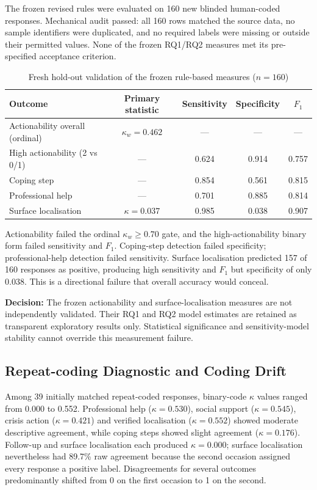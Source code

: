 The frozen revised rules were evaluated on 160 new blinded human-coded responses. Mechanical audit passed: all 160 rows matched the source data, no sample identifiers were duplicated, and no required labels were missing or outside their permitted values. None of the frozen RQ1/RQ2 measures met its pre-specified acceptance criterion.

\begin{table}[H]
\centering
\caption{Fresh hold-out validation of the frozen rule-based measures ($n=160$)}
\label{tab:fresh_holdout}
\begin{tabular}{lcccc}
\toprule
Outcome & Primary statistic & Sensitivity & Specificity & $F_1$ \\
\midrule
Actionability overall (ordinal) & $\kappa_w=0.462$ & --- & --- & --- \\
High actionability (2 vs 0/1) & --- & 0.624 & 0.914 & 0.757 \\
Coping step & --- & 0.854 & 0.561 & 0.815 \\
Professional help & --- & 0.701 & 0.885 & 0.814 \\
Surface localisation & $\kappa=0.037$ & 0.985 & 0.038 & 0.907 \\
\bottomrule
\end{tabular}
\end{table}

Actionability failed the ordinal $\kappa_w\geq0.70$ gate, and the high-actionability binary form failed sensitivity and $F_1$. Coping-step detection failed specificity; professional-help detection failed sensitivity. Surface localisation predicted 157 of 160 responses as positive, producing high sensitivity and $F_1$ but specificity of only 0.038. This is a directional failure that overall accuracy would conceal.

\textbf{Decision:} The frozen actionability and surface-localisation measures are not independently validated. Their RQ1 and RQ2 model estimates are retained as transparent exploratory results only. Statistical significance and sensitivity-model stability cannot override this measurement failure.

\subsection{Repeat-coding Diagnostic and Coding Drift}

Among 39 initially matched repeat-coded responses, binary-code $\kappa$ values ranged from 0.000 to 0.552. Professional help ($\kappa=0.530$), social support ($\kappa=0.545$), crisis action ($\kappa=0.421$) and verified localisation ($\kappa=0.552$) showed moderate descriptive agreement, while coping steps showed slight agreement ($\kappa=0.176$). Follow-up and surface localisation each produced $\kappa=0.000$; surface localisation nevertheless had 89.7\% raw agreement because the second occasion assigned every response a positive label. Disagreements for several outcomes predominantly shifted from 0 on the first occasion to 1 on the second.

